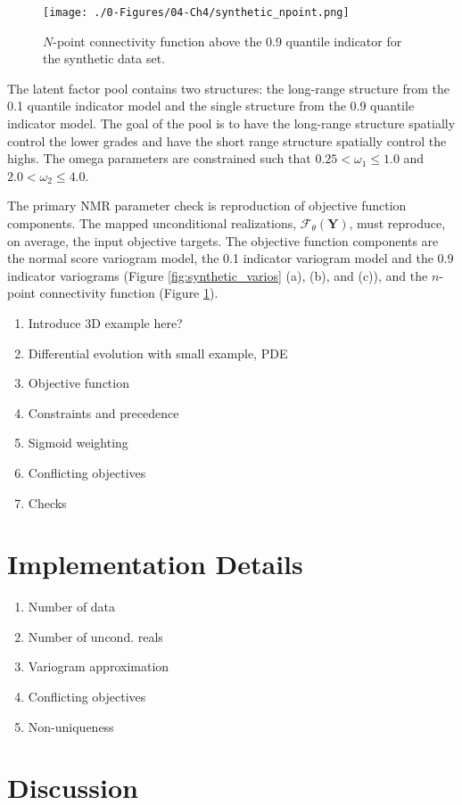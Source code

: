 \begin{figure}[htb!]
    \centering
    \texttt{[image: ./0-Figures/04-Ch4/synthetic\_npoint.png]}
    \caption{$N$-point connectivity function above the 0.9 quantile indicator for the synthetic data set.}
    \label{fig:synthetic_npoint}
\end{figure}

The latent factor pool contains two structures: the long-range structure from the 0.1 quantile indicator model and the single structure from the 0.9 quantile indicator model. The goal of the pool is to have the long-range structure spatially control the lower grades and have the short range structure spatially control the highs. The omega parameters are constrained such that $0.25 < \omega_{1} \leq 1.0$ and $2.0 < \omega_{2} \leq 4.0$.

The primary \gls{NMR} parameter check is reproduction of objective function components. The mapped unconditional realizations, $\mathcal{F}_{\theta}\left(\mathbf{Y}\right)$, must reproduce, on average, the input objective targets. The objective function components are the normal score variogram model, the 0.1 indicator variogram model and the 0.9 indicator variograms (Figure \ref{fig:synthetic_varios} (a), (b), and (c)), and the $n$-point connectivity function (Figure \ref{fig:synthetic_npoint}).




\begin{enumerate}[noitemsep]
    \item Introduce 3D example here?
    \item Differential evolution with small example, PDE
    \item Objective function
    \item Constraints and precedence
    \item Sigmoid weighting
    \item Conflicting objectives
    \item Checks
\end{enumerate}


\FloatBarrier
\section{Implementation Details}
\label{sec:04implementd}

\begin{enumerate}[noitemsep]
    \item Number of data
    \item Number of uncond. reals
    \item Variogram approximation
    \item Conflicting objectives
    \item Non-uniqueness
\end{enumerate}


\FloatBarrier
\section{Discussion}
\label{sec:04discuss}